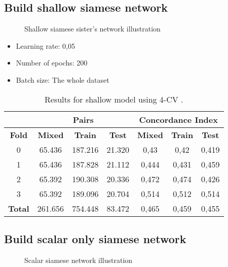 \subsection{Build shallow siamese network}
\begin{frame}{\insertsubsec}
  \begin{figure}
    \centering
    \scalebox{.7}{}
    \caption{Shallow siamese sister's network illustration \label{fig:shallow-implement}}
  \end{figure}
\end{frame}

\begin{frame}
  \begin{itemize}
    \item Learning rate: 0,05
    \item Number of epochs: 200
    \item Batch size: The whole dataset
  \end{itemize}

  \begin{table}
    \centering
    \begin{tabular}{|c||c|c|c||c|c|c|}
      \cline{2-7}
      \multicolumn{1}{c|}{} & \multicolumn{3}{|c||}{\textbf{Pairs}} & 
      \multicolumn{3}{c|}{\textbf{Concordance Index}} \\
      \hline
      \textbf{Fold} & \textbf{Mixed} & \textbf{Train} & \textbf{Test} & 
      \textbf{Mixed} & \textbf{Train} & \textbf{Test} \\
      \hhline{=======}
      0 & 65.436 & 187.216 & 21.320 & 0,43 & 0,42 & 0,419 \\
      1 & 65.436 & 187.828 & 21.112 & 0,444 & 0,431 & 0,459 \\
      2 & 65.392 & 190.308 & 20.336 & 0,472 & 0,474 & 0,426 \\
      3 & 65.392 & 189.096 & 20.704 & 0,514 & 0,512 & 0,514 \\
      \hhline{=======}
      \textbf{Total} & 261.656 & 754.448 & 83.472 & 0,465 & 0,459 & 0,455 \\
      \hline
    \end{tabular}
  
    \caption[Shallow 4-CV results]{
      Results for shallow model using 4-CV \label{tab:results-shallow-4CV}.
    }
  \end{table}
\end{frame}

\subsection{Build scalar only siamese network}
\begin{frame}{\insertsubsec}
  \begin{figure}
    \centering
    
    \caption{Scalar siamese network illustration \label{fig:scalar-implement}}
  \end{figure}
\end{frame}

